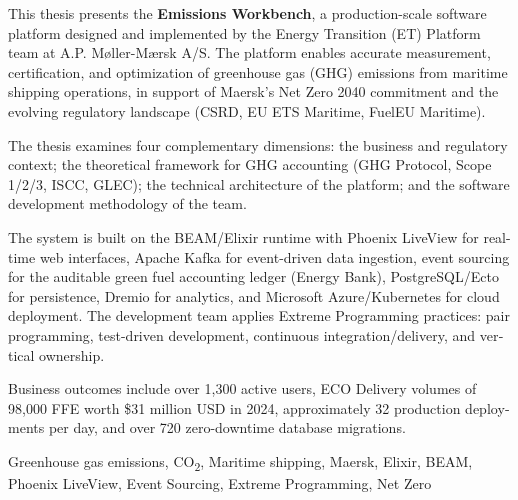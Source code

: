 \begin{abstracteng}
\begin{english}
This thesis presents the \textbf{Emissions Workbench}, a production-scale software platform designed and implemented by the Energy Transition (ET) Platform team at A.P. Møller-Mærsk A/S. The platform enables accurate measurement, certification, and optimization of greenhouse gas (GHG) emissions from maritime shipping operations, in support of Maersk's Net Zero 2040 commitment and the evolving regulatory landscape (CSRD, EU ETS Maritime, FuelEU Maritime).

The thesis examines four complementary dimensions: the business and regulatory context; the theoretical framework for GHG accounting (GHG Protocol, Scope 1/2/3, ISCC, GLEC); the technical architecture of the platform; and the software development methodology of the team.

The system is built on the BEAM/Elixir runtime with Phoenix LiveView for real-time web interfaces, Apache Kafka for event-driven data ingestion, event sourcing for the auditable green fuel accounting ledger (Energy Bank), PostgreSQL/Ecto for persistence, Dremio for analytics, and Microsoft Azure/Kubernetes for cloud deployment. The development team applies Extreme Programming practices: pair programming, test-driven development, continuous integration/delivery, and vertical ownership.

Business outcomes include over 1,300 active users, ECO Delivery volumes of 98,000 FFE worth \$31 million USD in 2024, approximately 32 production deployments per day, and over 720 zero-downtime database migrations.
\end{english}

\begin{keywordseng}
\begin{english}
Greenhouse gas emissions, CO\textsubscript{2}, Maritime shipping, Maersk, Elixir, BEAM, Phoenix LiveView, Event Sourcing, Extreme Programming, Net Zero
\end{english}
\end{keywordseng}
\end{abstracteng}
